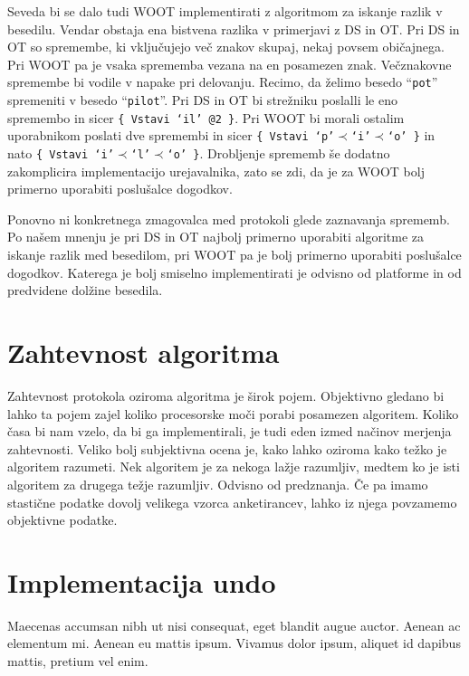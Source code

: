 \documentclass[a4paper, 12pt, twoside]{book}
\begin{document}
Seveda bi se dalo tudi WOOT implementirati z algoritmom za iskanje razlik v besedilu. Vendar obstaja ena bistvena razlika v primerjavi z DS in OT. Pri DS in OT so spremembe, ki vključujejo več znakov skupaj, nekaj povsem običajnega. Pri WOOT pa je vsaka sprememba vezana na en posamezen znak. Večznakovne spremembe bi vodile v napake pri delovanju. Recimo, da želimo besedo “{\tt pot}” spremeniti v besedo “{\tt pilot}”. Pri DS in OT bi strežniku poslalli le eno spremembo in sicer {\tt \{ Vstavi ‘il’ @2 \}}. Pri WOOT bi morali ostalim uporabnikom poslati dve spremembi in sicer {\tt \{ Vstavi ‘p’$\prec$‘i’$\prec$‘o’ \}} in nato {\tt \{ Vstavi ‘i’$\prec$‘l’$\prec$‘o’ \}}. Drobljenje sprememb še dodatno zakomplicira implementacijo urejavalnika, zato se zdi, da je za WOOT bolj primerno uporabiti poslušalce dogodkov.

Ponovno ni konkretnega zmagovalca med protokoli glede zaznavanja sprememb. Po našem mnenju je pri DS in OT najbolj primerno uporabiti algoritme za iskanje razlik med besedilom, pri WOOT pa je bolj primerno uporabiti poslušalce dogodkov. Katerega je bolj smiselno implementirati je odvisno od platforme in od predvidene dolžine besedila.

\section{Zahtevnost algoritma}

Zahtevnost protokola oziroma algoritma je širok pojem. Objektivno gledano bi lahko ta pojem zajel koliko procesorske moči porabi posamezen algoritem. Koliko časa bi nam vzelo, da bi ga implementirali, je tudi eden izmed načinov merjenja zahtevnosti. Veliko bolj subjektivna ocena je, kako lahko oziroma kako težko je algoritem razumeti. Nek algoritem je za nekoga lažje razumljiv, medtem ko je isti algoritem za drugega težje razumljiv. Odvisno od predznanja. Če pa imamo stastične podatke dovolj velikega vzorca anketirancev, lahko iz njega povzamemo objektivne podatke.

\section{Implementacija undo}

Maecenas accumsan nibh ut nisi consequat, eget blandit augue auctor. Aenean ac elementum mi. Aenean eu mattis ipsum. Vivamus dolor ipsum, aliquet id dapibus mattis, pretium vel enim.
\end{document}
